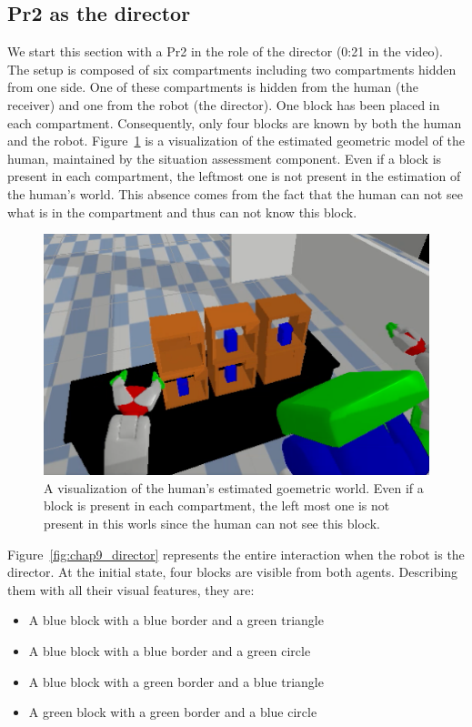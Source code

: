 \subsection{Pr2 as the director}

We start this section with a Pr2 in the role of the director (0:21 in the video). The setup is composed of six compartments including two compartments hidden from one side. One of these compartments is hidden from the human (the receiver) and one from the robot (the director). One block has been placed in each compartment. Consequently, only four blocks are known by both the human and the robot. Figure~\ref{fig:chap9_robot_view} is a visualization of the estimated geometric model of the human, maintained by the situation assessment component. Even if a block is present in each compartment, the leftmost one is not present in the estimation of the human's world. This absence comes from the fact that the human can not see what is in the compartment and thus can not know this block.

\begin{figure}[ht!]
\centering
\includegraphics[scale=0.5]{figures/chapter9/robot_view.png}
\caption{\label{fig:chap9_robot_view} A visualization of the human's estimated goemetric world. Even if a block is present in each compartment, the left most one is not present in this worls since the human can not see this block. }
\end{figure}

Figure~\ref{fig:chap9_director} represents the entire interaction when the robot is the director. At the initial state, four blocks are visible from both agents. Describing them with all their visual features, they are:

\begin{itemize}
  \item A blue block with a blue border and a green triangle
  \item A blue block with a blue border and a green circle
  \item A blue block with a green border and a blue triangle
  \item A green block with a green border and a blue circle
\end{itemize}

